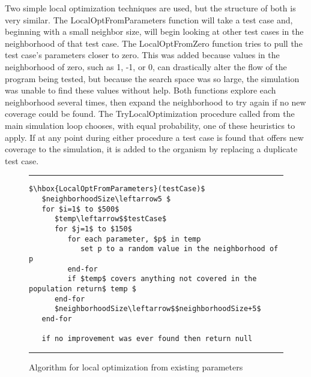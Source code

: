 \documentclass[runningheads]{llncs}
\begin{document}
Two simple local optimization techniques are used, but the structure of both is very similar. The LocalOptFromParameters function will take a test case and, beginning with a small neighbor size, will begin looking at other test cases in the neighborhood of that test case. The LocalOptFromZero function tries to pull the test case's parameters closer to zero. This was added because values in the neighborhood of zero, such as 1, -1, or 0, can drastically alter the flow of the program being tested, but because the search space was so large, the simulation was unable to find these values without help. Both functions explore each neighborhood several times, then expand the neighborhood to try again if no new coverage could be found. The TryLocalOptimization procedure called from the main simulation loop chooses, with equal probability, one of these heuristics to apply. If at any point during either procedure a test case is found that offers new coverage to the simulation, it is added to the organism by replacing a duplicate test case.
\begin{comment}
\begin{figure}[h!]
\begin{center}
\hrule
\medskip
\begin{Verbatim}[fontfamily=tt, xleftmargin=10pt, commandchars=\\\{\},
codes={\catcode`$=3\catcode`^=7\catcode`_=8}]
$\hbox{TryLocalOptimization}()$
      $org\leftarrow$$P$.Select()
		
      Randomaly select one of the two local opt functions and try it on a 
         duplicate test case from $org$, store results in$ tc $
		
      if$ tc $ is not null replace a duplicate test case in$ org $ with tc
\end{Verbatim}
\hrule
\end{center}
\caption{Algorithm for selection of a local optimization \label{fig:lcOpt}}
\end{figure
\end{comment}
\begin{figure}[h!]
	\begin{center}
		\hrule
		\medskip
		\begin{Verbatim}[fontfamily=tt, xleftmargin=10pt, commandchars=\\\{\},
		codes={\catcode`$=3\catcode`^=7\catcode`_=8}]
$\hbox{LocalOptFromParameters}(testCase)$
   $neighborhoodSize\leftarrow5 $
   for $i=1$ to $500$ 
      $temp\leftarrow$$testCase$
      for $j=1$ to $150$
         for each parameter, $p$ in temp
            set p to a random value in the neighborhood of p
         end-for     
         if $temp$ covers anything not covered in the population return$ temp $
      end-for
      $neighborhoodSize\leftarrow$$neighborhoodSize+5$
   end-for

   if no improvement was ever found then return null
		\end{Verbatim}
		\hrule
	\end{center}
	\caption{Algorithm for local optimization from existing parameters \label{fig:lcOptFP}}
\end{figure}
\end{document}
